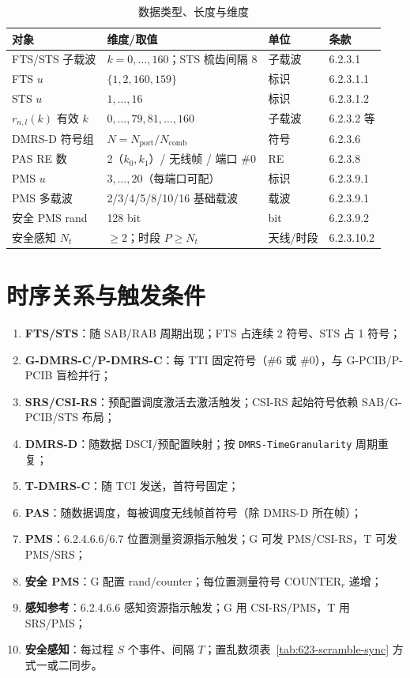 \documentclass[11pt,a4paper]{ctexart}
\begin{document}
\begin{longtable}{llll}
\caption{数据类型、长度与维度} \\
\toprule
\textbf{对象} & \textbf{维度/取值} & \textbf{单位} & \textbf{条款} \\
\midrule
FTS/STS 子载波 & $k{=}0,\ldots,160$；STS 梳齿间隔 8 & 子载波 & 6.2.3.1 \\
FTS $u$ & $\{1,2,160,159\}$ & 标识 & 6.2.3.1.1 \\
STS $u$ & $1,\ldots,16$ & 标识 & 6.2.3.1.2 \\
$r_{n,l}(k)$ 有效 $k$ & $0,\ldots,79,81,\ldots,160$ & 子载波 & 6.2.3.2 等 \\
DMRS-D 符号组 & $N = N_{\mathrm{port}}/N_{\mathrm{comb}}$ & 符号 & 6.2.3.6 \\
PAS RE 数 & 2（$k_0,k_1$）/ 无线帧 / 端口 \#0 & RE & 6.2.3.8 \\
PMS $u$ & $3,\ldots,20$（每端口可配） & 标识 & 6.2.3.9.1 \\
PMS 多载波 & 2/3/4/5/8/10/16 基础载波 & 载波 & 6.2.3.9.1 \\
安全 PMS rand & 128 bit & bit & 6.2.3.9.2 \\
安全感知 $N_t$ & $\geq 2$；时段 $P\geq N_t$ & 天线/时段 & 6.2.3.10.2 \\
\bottomrule
\end{longtable}

\section{时序关系与触发条件}

\begin{enumerate}[nosep]
  \item \textbf{FTS/STS}：随 SAB/RAB 周期出现；FTS 占连续 2 符号、STS 占 1 符号；
  \item \textbf{G-DMRS-C/P-DMRS-C}：每 TTI 固定符号（\#6 或 \#0），与 G-PCIB/P-PCIB 盲检并行；
  \item \textbf{SRS/CSI-RS}：预配置调度激活去激活触发；CSI-RS 起始符号依赖 SAB/G-PCIB/STS 布局；
  \item \textbf{DMRS-D}：随数据 DSCI/预配置映射；按 \texttt{DMRS-TimeGranularity} 周期重复；
  \item \textbf{T-DMRS-C}：随 TCI 发送，首符号固定；
  \item \textbf{PAS}：随数据调度，每被调度无线帧首符号（除 DMRS-D 所在帧）；
  \item \textbf{PMS}：6.2.4.6.6/6.7 位置测量资源指示触发；G 可发 PMS/CSI-RS，T 可发 PMS/SRS；
  \item \textbf{安全 PMS}：G 配置 rand/counter；每位置测量符号 $\mathrm{COUNTER}_r$ 递增；
  \item \textbf{感知参考}：6.2.4.6.6 感知资源指示触发；G 用 CSI-RS/PMS，T 用 SRS/PMS；
  \item \textbf{安全感知}：每过程 $S$ 个事件、间隔 $T$；置乱数须表~\ref{tab:623-scramble-sync} 方式一或二同步。
\end{enumerate}
\end{document}
